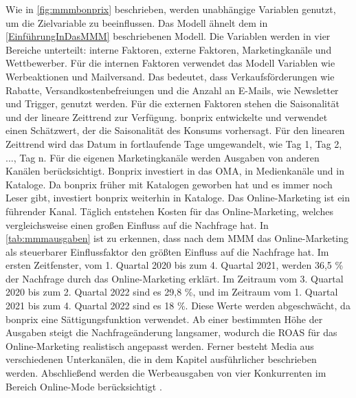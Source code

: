 Wie in \autoref{fig:mmmbonprix} beschrieben, werden unabhängige Variablen genutzt, um die Zielvariable  zu beeinflussen. Das Modell ähnelt dem in \autoref{EinführungInDasMMM} beschriebenen Modell. Die Variablen werden in vier Bereiche unterteilt: interne Faktoren, externe Faktoren, Marketingkanäle und Wettbewerber. Für die internen Faktoren verwendet das Modell Variablen wie Werbeaktionen und Mailversand. Das bedeutet, dass Verkaufsförderungen wie Rabatte, Versandkostenbefreiungen und die Anzahl an E-Mails, wie Newsletter und Trigger, genutzt werden. Für die externen Faktoren stehen die Saisonalität und der lineare Zeittrend zur Verfügung. bonprix entwickelte und verwendet einen Schätzwert, der die Saisonalität des Konsums vorhersagt. Für den linearen Zeittrend wird das Datum in fortlaufende Tage umgewandelt, wie Tag 1, Tag 2, ..., Tag n. Für die eigenen Marketingkanäle werden Ausgaben von anderen Kanälen berücksichtigt. Bonprix investiert in das \ac{OMA}, in Medienkanäle und in Kataloge. Da bonprix früher mit Katalogen geworben hat und es immer noch Leser gibt, investiert bonprix weiterhin in Kataloge. Das Online-Marketing ist ein führender Kanal. Täglich entstehen Kosten für das Online-Marketing, welches vergleichsweise einen großen Einfluss auf die Nachfrage hat. In 
\autoref{tab:mmmausgaben} ist zu erkennen, dass nach dem \ac{MMM} das Online-Marketing als steuerbarer Einflussfaktor den größten Einfluss auf die Nachfrage hat. Im ersten Zeitfenster, vom 1. Quartal 2020 bis zum 4. Quartal 2021, werden 36,5 \% der Nachfrage durch das Online-Marketing erklärt. Im Zeitraum vom 3. Quartal 2020 bis zum 2. Quartal 2022 sind es 29,8 \%, und im Zeitraum vom 1. Quartal 2021 bis zum 4. Quartal 2022 sind es 18 \%. Diese Werte werden abgeschwächt, da bonprix eine Sättigungsfunktion verwendet. Ab einer bestimmten Höhe der Ausgaben steigt die Nachfrageänderung langsamer, wodurch die ROAS für das Online-Marketing realistisch angepasst werden. Ferner besteht Media aus verschiedenen Unterkanälen, die in dem Kapitel  ausführlicher beschrieben werden. Abschließend werden die Werbeausgaben von vier Konkurrenten im Bereich Online-Mode berücksichtigt \cite{bonprixMMM}.\par
